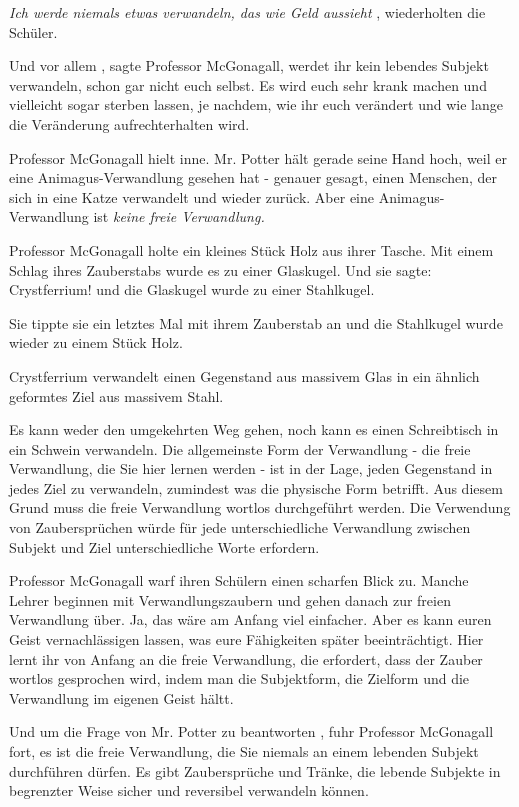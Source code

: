 \glqq \emph{Ich werde niemals etwas verwandeln, das wie Geld aussieht}\grqq{} ,
wiederholten die Schüler.

\glqq Und vor allem\grqq{} , sagte Professor McGonagall, \glqq werdet ihr kein
lebendes Subjekt verwandeln, schon gar nicht euch selbst. Es wird euch sehr
krank machen und vielleicht sogar sterben lassen, je nachdem, wie ihr euch
verändert und wie lange die Veränderung aufrechterhalten wird.\grqq{}

Professor McGonagall hielt inne. \glqq Mr. Potter hält gerade seine Hand hoch,
weil er eine Animagus-Verwandlung gesehen hat - genauer gesagt, einen Menschen,
der sich in eine Katze verwandelt und wieder zurück. Aber eine
Animagus-Verwandlung ist \emph{keine freie Verwandlung.}\grqq{}

Professor McGonagall holte ein kleines Stück Holz aus ihrer Tasche. Mit einem
Schlag ihres Zauberstabs wurde es zu einer Glaskugel. Und sie sagte: \glqq
Crystferrium!\grqq{} und die Glaskugel wurde zu einer Stahlkugel.

Sie tippte sie ein letztes Mal mit ihrem Zauberstab an und die Stahlkugel wurde
wieder zu einem Stück Holz.

\glqq Crystferrium verwandelt einen Gegenstand aus massivem Glas in ein ähnlich
geformtes Ziel aus massivem Stahl.

Es kann weder den umgekehrten Weg gehen, noch kann es einen Schreibtisch in ein
Schwein verwandeln. Die allgemeinste Form der Verwandlung - die freie
Verwandlung, die Sie hier lernen werden - ist in der Lage, jeden Gegenstand in
jedes Ziel zu verwandeln, zumindest was die physische Form betrifft. Aus diesem
Grund muss die freie Verwandlung wortlos durchgeführt werden. Die Verwendung von
Zaubersprüchen würde für jede unterschiedliche Verwandlung zwischen Subjekt und
Ziel unterschiedliche Worte erfordern.\grqq{}

Professor McGonagall warf ihren Schülern einen scharfen Blick zu. \glqq Manche
Lehrer beginnen mit Verwandlungszaubern und gehen danach zur freien Verwandlung
über. Ja, das wäre am Anfang viel einfacher. Aber es kann euren Geist
vernachlässigen lassen, was eure Fähigkeiten später beeinträchtigt. Hier lernt
ihr von Anfang an die freie Verwandlung, die erfordert, dass der Zauber wortlos
gesprochen wird, indem man die Subjektform, die Zielform und die Verwandlung im
eigenen Geist hältt.\grqq{}

\glqq Und um die Frage von Mr. Potter zu beantworten\grqq{} , fuhr Professor
McGonagall fort, \glqq es ist die freie Verwandlung, die Sie niemals an einem
lebenden Subjekt durchführen dürfen. Es gibt Zaubersprüche und Tränke, die
lebende Subjekte in begrenzter Weise sicher und reversibel verwandeln können.

